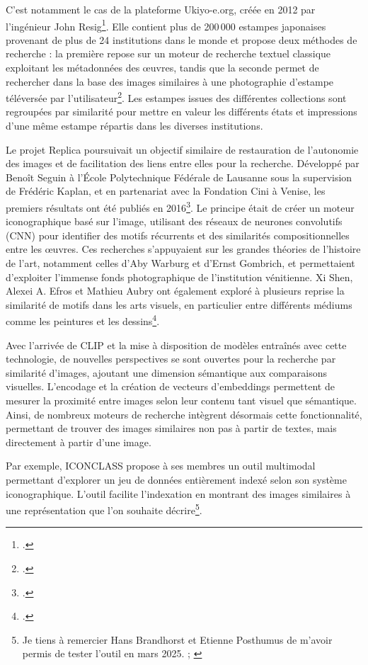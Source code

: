 C’est notamment le cas de la plateforme Ukiyo-e.org, créée en 2012 par l’ingénieur John Resig\footcite{resigUkiyoeorgJapanesePrint2012}. Elle contient plus de 200 000 estampes japonaises provenant de plus de 24 institutions dans le monde et propose deux méthodes de recherche : la première repose sur un moteur de recherche textuel classique exploitant les métadonnées des œuvres, tandis que la seconde permet de rechercher dans la base des images similaires à une photographie d’estampe téléversée par l’utilisateur\footcite{resigSite2012}. Les estampes issues des différentes collections sont regroupées par similarité pour mettre en valeur les différents états et impressions d’une même estampe répartis dans les diverses institutions.

Le projet Replica poursuivait un objectif similaire de restauration de l’autonomie des images et de facilitation des liens entre elles pour la recherche. Développé par Benoît Seguin à l’École Polytechnique Fédérale de Lausanne sous la supervision de Frédéric Kaplan, et en partenariat avec la Fondation Cini à Venise, les premiers résultats ont été publiés en 2016\footcite{seguinVisualLinkRetrieval2016}. Le principe était de créer un moteur iconographique basé sur l’image, utilisant des réseaux de neurones convolutifs (CNN) pour identifier des motifs récurrents et des similarités compositionnelles entre les œuvres. Ces recherches s’appuyaient sur les grandes théories de l’histoire de l’art, notamment celles d’Aby Warburg et d’Ernst Gombrich, et permettaient d’exploiter l’immense fonds photographique de l’institution vénitienne. Xi Shen, Alexei A. Efros et Mathieu Aubry ont également exploré à plusieurs reprise la similarité de motifs dans les arts visuels, en particulier entre différents médiums comme les peintures et les dessins\footcites{shenDiscoveringVisualPatterns2019}{shenSpatiallyConsistentFeatureMatching2022}.

Avec l’arrivée de CLIP et la mise à disposition de modèles entraînés avec cette technologie, de nouvelles perspectives se sont ouvertes pour la recherche par similarité d’images, ajoutant une dimension sémantique aux comparaisons visuelles. L’encodage et la création de vecteurs d’embeddings permettent de mesurer la proximité entre images selon leur contenu tant visuel que sémantique. Ainsi, de nombreux moteurs de recherche intègrent désormais cette fonctionnalité, permettant de trouver des images similaires non pas à partir de textes, mais directement à partir d’une image.

Par exemple, ICONCLASS propose à ses membres un outil multimodal permettant d’explorer un jeu de données entièrement indexé selon son système iconographique. L’outil facilite l’indexation en montrant des images similaires à une représentation que l’on souhaite décrire\footnote{Je tiens à remercier Hans Brandhorst et Etienne Posthumus de m’avoir permis de tester l’outil en mars 2025. \cite{santiniMultimodalSearchIconclass2023} ; \cite[diapositive 14 de la présentation]{brandhorstICONCLASSplus}}. 

